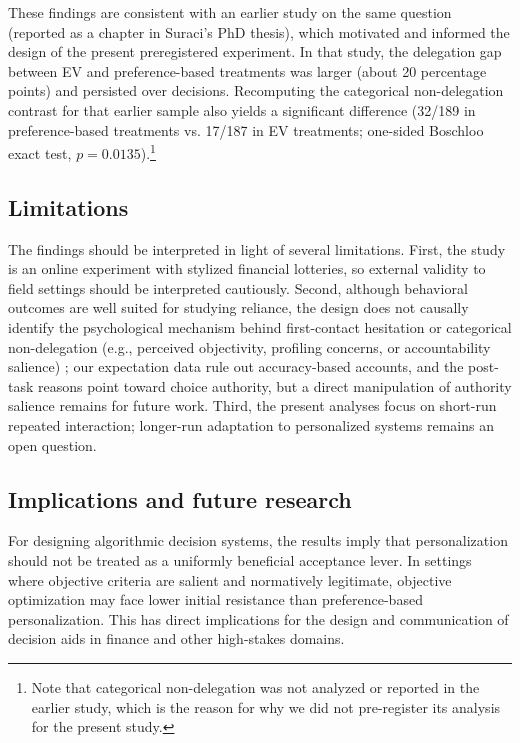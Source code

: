 \documentclass[a4paper, 12pt, fleqn]{article}
\theoremstyle{definition}
\newcommand{\inew}[1]{{\color{blue} #1\color{black}}}
\begin{document}
These findings are consistent with an earlier study on the same question (reported as a chapter in Suraci's PhD thesis), which motivated and informed the design of the present preregistered experiment. In that study, the delegation gap between EV and preference-based treatments was larger (about 20 percentage points) and persisted over decisions. Recomputing the categorical non-delegation contrast for that earlier sample also yields a significant difference (32/189 in preference-based treatments vs. 17/187 in EV treatments; one-sided Boschloo exact test, $p = 0.0135$).\footnote{Note that categorical non-delegation was not analyzed or reported in the earlier study, which is the reason for why we did not pre-register its analysis for the present study.}

\subsection{Limitations}
The findings should be interpreted in light of several limitations. First, the study is an online experiment with stylized financial lotteries, so external validity to field settings should be interpreted cautiously. Second, although behavioral outcomes are well suited for studying reliance, the design does not causally identify the psychological mechanism behind first-contact hesitation or categorical non-delegation (e.g., perceived objectivity, profiling concerns, or accountability salience)\inew{; our expectation data rule out accuracy-based accounts, and the post-task reasons point toward choice authority, but a direct manipulation of authority salience remains for future work}. Third, the present analyses focus on short-run repeated interaction; longer-run adaptation to personalized systems remains an open question.

\subsection{Implications and future research}
For designing algorithmic decision systems, the results imply that personalization should not be treated as a uniformly beneficial acceptance lever. In settings where objective criteria are salient and normatively legitimate, objective optimization may face lower initial resistance than preference-based personalization. This has direct implications for the design and communication of decision aids in finance and other high-stakes domains.
\end{document}
